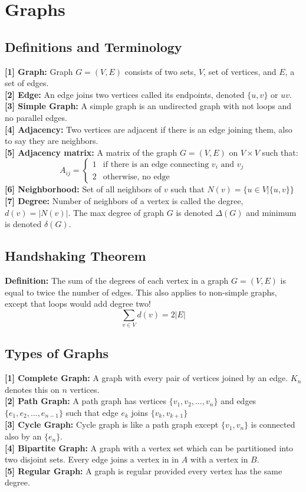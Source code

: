 \section{Graphs}
\subsection{Definitions and Terminology}
\textbf{[1] Graph:} Graph $G = (V,E)$ consists of two sets, $V$, set of vertices, and $E$, a set of edges.\\
\textbf{[2] Edge:} An edge joins two vertices called its endpoints, denoted $\{u,v\}$ or $uv$. \\
\textbf{[3] Simple Graph:} A simple graph is an undirected graph with not loops and no parallel edges.\\
\textbf{[4] Adjacency:} Two vertices are adjacent if there is an edge joining them, also to say they are neighbors.\\
\textbf{[5] Adjacency matrix:} A matrix of the graph $G = (V,E)$ on $V \times V$ such that:
$$
A_{ij} = \begin{cases}
    1 & \text{if there is an edge connecting $v_i$ and $v_j$} \\
    2 & \text{otherwise, no edge}
\end{cases}
$$
\textbf{[6] Neighborhood:} Set of all neighbors of $v$ such that $N(v) = \{u \in V | \{u,v\}\}$\\
\textbf{[7] Degree:} Number of neighbors of a vertex is called the degree, $d(v) = |N(v)|$. The max degree of graph $G$ is denoted $\Delta(G)$ and minimum is denoted $\delta(G)$.\\
\subsection{Handshaking Theorem}
\textbf{Definition:} The sum of the degrees of each vertex in a graph $G = (V,E)$ is equal to twice the number of edges. This also applies to non-simple graphs, except that loops would add degree two!
$$
\sum_{v \in V} d(v) = 2|E|
$$
\subsection{Types of Graphs}
\textbf{[1] Complete Graph:} A graph with every pair of vertices joined by an edge. $K_n$ denotes this on $n$ vertices.\\
\textbf{[2] Path Graph:} A path graph has vertices $\{v_1,v_2,\dots,v_n\}$ and edges $\{e_1,e_2,\dots,e_{n-1}\}$ such that edge $e_k$ joins $\{v_k,v_{k+1}\}$\\
\textbf{[3] Cycle Graph:} Cycle graph is like a path graph except $\{v_1,v_n\}$ is connected also by an $\{e_n\}$.\\
\textbf{[4] Bipartite Graph:} A graph with a vertex set which can be partitioned into two disjoint sets. Every edge joins a vertex in in $A$ with a vertex in $B$.\\
\textbf{[5] Regular Graph:} A graph is regular provided every vertex has the same degree.
